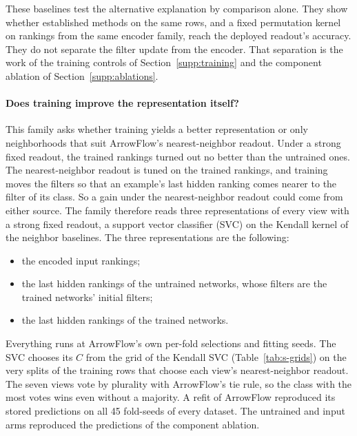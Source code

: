 These baselines test the alternative explanation by comparison alone. They show whether established methods on the same rows, and a fixed permutation kernel on rankings from the same encoder family, reach the deployed readout's accuracy. They do not separate the filter update from the encoder. That separation is the work of the training controls of Section~\ref{supp:training} and the component ablation of Section~\ref{supp:ablations}.

\clearpage






\paragraph{Does training improve the representation itself?} This family asks whether training yields a better representation or only neighborhoods that suit ArrowFlow's nearest-neighbor readout. Under a strong fixed readout, the trained rankings turned out no better than the untrained ones. The nearest-neighbor readout is tuned on the trained rankings, and training moves the filters so that an example's last hidden ranking comes nearer to the filter of its class. So a gain under the nearest-neighbor readout could come from either source. The family therefore reads three representations of every view with a strong fixed readout, a support vector classifier (SVC) on the Kendall kernel of the neighbor baselines. The three representations are the following:
\begin{itemize}[leftmargin=2em,topsep=2pt,itemsep=1pt]
\item the encoded input rankings;
\item the last hidden rankings of the untrained networks, whose filters are the trained networks' initial filters;
\item the last hidden rankings of the trained networks.
\end{itemize}
Everything runs at ArrowFlow's own per-fold selections and fitting seeds. The SVC chooses its $C$ from the grid of the Kendall SVC (Table~\ref{tab:s-grids}) on the very splits of the training rows that choose each view's nearest-neighbor readout. The seven views vote by plurality with ArrowFlow's tie rule, so the class with the most votes wins even without a majority. A refit of ArrowFlow reproduced its stored predictions on all 45 fold-seeds of every dataset. The untrained and input arms reproduced the predictions of the component ablation.

